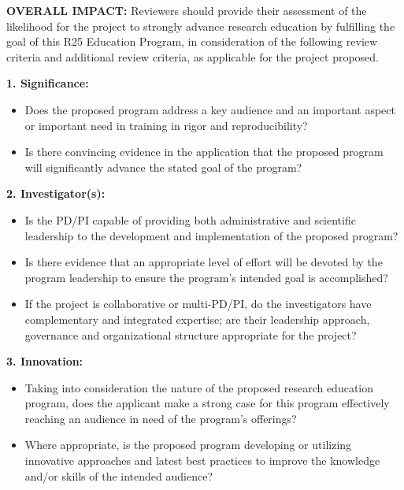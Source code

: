 \documentclass[pdftex,english,11pt,parskip=half]{scrartcl}
\begin{document}
\def\bf{\normalfont\bfseries}
\pagestyle{empty}

\textbf{OVERALL IMPACT:} Reviewers should provide their assessment of the likelihood for the project to strongly advance research education by fulfilling the goal of this R25 Education Program, in consideration of the following review criteria and additional review criteria, as applicable for the project proposed.

\textbf{1. Significance:}

\begin{itemize}
\item Does the proposed program address a key audience and an important aspect or important need in training in rigor and reproducibility?
\item Is there convincing evidence in the application that the proposed program will significantly advance the stated goal of the program?
\end{itemize}

\textbf{2. Investigator(s):}

\begin{itemize}
\item Is the PD/PI capable of providing both administrative and scientific leadership to the development and implementation of the proposed program?
\item Is there evidence that an appropriate level of effort will be devoted by the program leadership to ensure the program's intended goal is accomplished?
\item If the project is collaborative or multi-PD/PI, do the investigators have complementary and integrated expertise; are their leadership approach, governance and organizational structure appropriate for the project?
\end{itemize}

\textbf{3. Innovation:}

\begin{itemize}
\item Taking into consideration the nature of the proposed research education program, does the applicant make a strong case for this program effectively reaching an audience in need of the program's offerings?
\item Where appropriate, is the proposed program developing or utilizing innovative approaches and latest best practices to improve the knowledge and/or skills of the intended audience?
\end{itemize}
\end{document}
